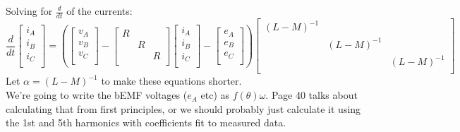 \documentclass[fleqn]{article}
\begin{document}
\begin{flushleft}
Solving for $\frac{d}{dt}$ of the currents:
\[
 \frac{d}{dt}
  \begin{bmatrix}
    i_A \\
    i_B \\
    i_C \\
  \end{bmatrix}
  =
  \left(
  \begin{bmatrix}
    v_A \\
    v_B \\
    v_C \\
  \end{bmatrix}
  -
  \begin{bmatrix}
    R &   &   \\
      & R &   \\
      &   & R \\
  \end{bmatrix}
  \begin{bmatrix}
    i_A \\
    i_B \\
    i_C \\
  \end{bmatrix}
  -
  \begin{bmatrix}
    e_A \\
    e_B \\
    e_C \\
  \end{bmatrix}
  \right)
  \begin{bmatrix}
    (L - M)^{-1} &              &              \\
                 & (L - M)^{-1} &              \\
                 &              & (L - M)^{-1} \\
  \end{bmatrix}
\]
Let $\alpha = (L - M)^{-1}$ to make these equations shorter.
\\
We're going to write the bEMF voltages ($e_A$ etc) as $f(\theta) \omega$.
Page 40 talks about calculating that from first principles, or we should
probably just calculate it using the 1st and 5th harmonics with coefficients
fit to measured data.


\end{flushleft}
\end{document}
